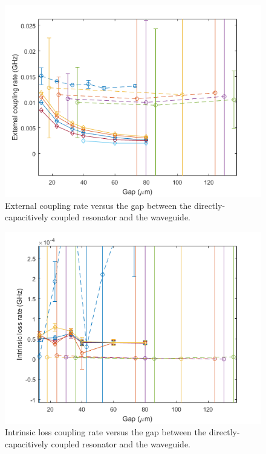\documentclass[noshowpacs,amsmath,
superscriptaddress,
10pt]{article}
\begin{document}
\begin{figure}[!ht]
\centering
\includegraphics[width=12cm] {eCap_ke}
\caption{External coupling rate versus the gap between the directly-capacitively coupled resonator and the waveguide.}
\label{pic:eCap_ke}
\end{figure}

\begin{figure}[!ht]
\centering
\includegraphics[width=12cm] {eCap_ki}
\caption{Intrinsic loss coupling rate versus the gap between the directly-capacitively coupled resonator and the waveguide.}
\label{pic:eCap_ki}
\end{figure}
\end{document}
